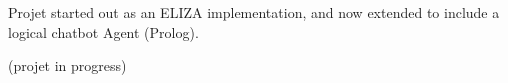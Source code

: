 Projet started out as an E\+L\+I\+ZA implementation, and now extended to include a logical chatbot Agent (Prolog).

(projet in progress) 